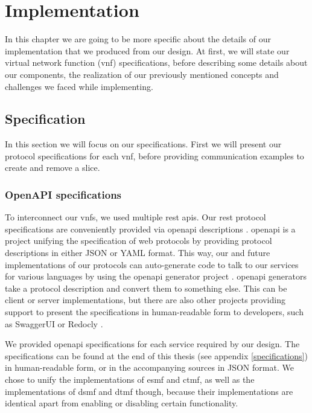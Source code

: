 \chapter{Implementation}
\label{implementation}

In this chapter we are going to be more specific about the details of our implementation that we produced from our design. At first, we will state our virtual network function (\acrshort{vnf}) specifications, before describing some details about our components, the realization of our previously mentioned concepts and challenges we faced while implementing.


\section{Specification}
\label{impl_specification}
In this section we will focus on our specifications. First we will present our protocol specifications for each \acrshort{vnf}, before providing communication examples to create and remove a slice.

\subsection{OpenAPI specifications}
To interconnect our \acrshort{vnf}s, we used multiple \acrshort{rest} \acrshort{api}s. Our \acrshort{rest} protocol specifications are conveniently provided via \Gls{openapi} descriptions \cite{openapi}. \Gls{openapi} is a project unifying the specification of web protocols by providing protocol descriptions in either JSON or YAML format. This way, our and future implementations of our protocols can auto-generate code to talk to our services for various languages by using the \Gls{openapi} generator project \cite{openapi-generator}. \Gls{openapi} generators take a protocol description and convert them to something else. This can be client or server implementations, but there are also other projects providing support to present the specifications in human-readable form to developers, such as SwaggerUI \cite{swaggerui} or Redocly \cite{redocly}.

We provided \Gls{openapi} specifications for each service required by our design. The specifications can be found at the end of this thesis (see appendix \ref{specifications}) in human-readable form, or in the accompanying sources in JSON format. We chose to unify the implementations of \acrshort{esmf} and \acrshort{ctmf}, as well as the implementations of \acrshort{dsmf} and \acrshort{dtmf} though, because their implementations are identical apart from enabling or disabling certain functionality.

